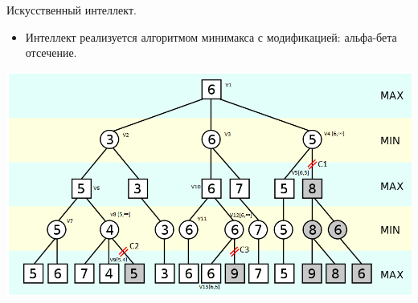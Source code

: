 \documentclass[11pt,slides,aspectratio=43]{beamer}
\begin{document}
    \begin{frame}{Искусственный интеллект.}
		\begin{itemize}
	           \item Интеллект реализуется алгоритмом минимакса с модификацией: альфа-бета отсечение.
        \end{itemize}
        \begin{center}
			     \includegraphics[scale=0.33]{tree.png}
		\end{center}
	\end{frame}

	
\end{document}
